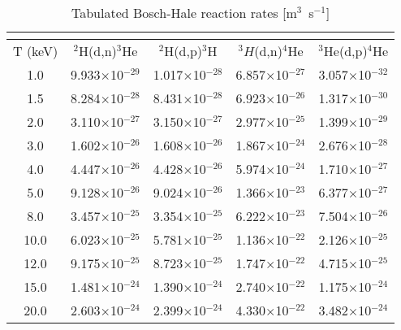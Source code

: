 \begin{table}[h!]\small
  \noindent
  \centering
  \caption{Tabulated Bosch-Hale reaction rates [m$^3$~s$^{-1}$]}
  \begin{tabular}{c | c c | c | c}
    \multicolumn{5}{c}{}\\
    \hline
    T (keV) & $^2$H(d,n)$^3$He & $^2$H(d,p)$^3$H & $^3H$(d,n)$^4$He & $^3$He(d,p)$^4$He\\
    \hline\hline
    1.0& 9.933$\times$10$^{-29}$ & 1.017$\times$10$^{-28}$ & 6.857$\times$10$^{-27}$ & 3.057$\times$10$^{-32}$ \\
    1.5  & 8.284$\times$10$^{-28}$ & 8.431$\times$10$^{-28}$ & 6.923$\times$10$^{-26}$ & 1.317$\times$10$^{-30}$ \\
    2.0  & 3.110$\times$10$^{-27}$ & 3.150$\times$10$^{-27}$ & 2.977$\times$10$^{-25}$ & 1.399$\times$10$^{-29}$ \\
    3.0  & 1.602$\times$10$^{-26}$ & 1.608$\times$10$^{-26}$ & 1.867$\times$10$^{-24}$ & 2.676$\times$10$^{-28}$ \\
    4.0  & 4.447$\times$10$^{-26}$ & 4.428$\times$10$^{-26}$ & 5.974$\times$10$^{-24}$ & 1.710$\times$10$^{-27}$ \\
    5.0  & 9.128$\times$10$^{-26}$ & 9.024$\times$10$^{-26}$ & 1.366$\times$10$^{-23}$ & 6.377$\times$10$^{-27}$ \\
    8.0  & 3.457$\times$10$^{-25}$ & 3.354$\times$10$^{-25}$ & 6.222$\times$10$^{-23}$ & 7.504$\times$10$^{-26}$ \\
   10.0  & 6.023$\times$10$^{-25}$ & 5.781$\times$10$^{-25}$ & 1.136$\times$10$^{-22}$ & 2.126$\times$10$^{-25}$ \\
   12.0  & 9.175$\times$10$^{-25}$ & 8.723$\times$10$^{-25}$ & 1.747$\times$10$^{-22}$ & 4.715$\times$10$^{-25}$ \\
   15.0  & 1.481$\times$10$^{-24}$ & 1.390$\times$10$^{-24}$ & 2.740$\times$10$^{-22}$ & 1.175$\times$10$^{-24}$ \\
   20.0& 2.603$\times$10$^{-24}$ & 2.399$\times$10$^{-24}$ & 4.330$\times$10$^{-22}$ & 3.482$\times$10$^{-24}$ \\
   \hline
  \end{tabular}
  \label{table:rr}
\end{table}

